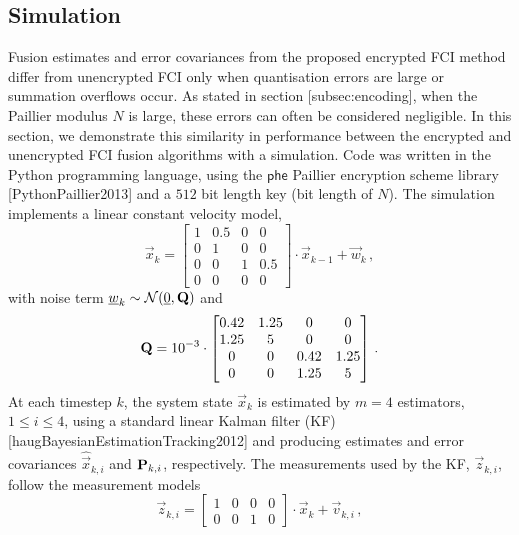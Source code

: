 % 
% 
\subsection{Simulation}\label{sec:simulation}
Fusion estimates and error covariances from the proposed encrypted FCI method differ from unencrypted FCI only when quantisation errors are large or summation overflows occur. As stated in section [subsec:encoding], when the Paillier modulus $N$ is large, these errors can often be considered negligible. In this section, we demonstrate this similarity in performance between the encrypted and unencrypted FCI fusion algorithms with a simulation. Code was written in the Python programming language, using the $\mathsf{phe}$ Paillier encryption scheme library [PythonPaillier2013] and a $512$ bit length key (bit length of $N$). The simulation implements a linear constant velocity model,
\begin{equation}\label{eqn:sim_sys_model}
    \vec{x}_k =
    \begin{bmatrix}
        1 & 0.5 & 0 & 0\\
        0 & 1 & 0 & 0\\
        0 & 0 & 1 & 0.5\\
        0 & 0 & 0 & 0
    \end{bmatrix}
    \cdot \vec{x}_{k-1} + \vec{w}_k\,,
\end{equation}
with noise term ${\underline{w}}_k \sim \mathcal{N}({\underline{0}}, {{\mathbf{Q}}})$ and
\begin{equation}
    {\ensuremath{{\mathbf{Q}}}} = 10^{-3} \cdot
    \begin{bmatrix}
        0.42 & 1.25 & 0 & 0\\
        1.25 & 5 & 0 & 0\\
        0 & 0 & 0.42 & 1.25\\
        0 & 0 & 1.25 & 5
    \end{bmatrix}\,.
\end{equation}
At each timestep $k$, the system state $\vec{x}_k$ is estimated by $m=4$ estimators, $1\leq i \leq 4$, using a standard linear Kalman filter (KF) [haugBayesianEstimationTracking2012] and producing estimates and error covariances $\hat{\vec{x}}_{k,i}$ and ${{\mathbf{P}}}_{k,i}$, respectively. The measurements used by the KF, $\vec{z}_{k,i}$, follow the measurement models
\begin{equation}
    \vec{z}_{k,i} = 
    \begin{bmatrix}
        1 & 0 & 0 & 0\\
        0 & 0 & 1 & 0
    \end{bmatrix}
    \cdot \vec{x}_k + \vec{v}_{k,i}\,,
\end{equation}

